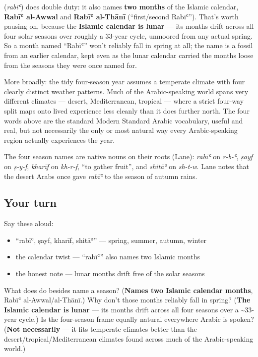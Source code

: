 \begin{culture}
\textbf{} (\emph{rabīʿ}) does double duty: it also names \textbf{two months} of the Islamic calendar, \textbf{Rabīʿ al-Awwal} and \textbf{Rabīʿ al-Thānī} (\textquotedblleft{}first/second Rabīʿ\textquotedblright{}). That's worth pausing on, because the \textbf{Islamic calendar is lunar} — its months drift across all four solar seasons over roughly a 33-year cycle, unmoored from any actual spring. So a month named \textquotedblleft{}Rabīʿ\textquotedblright{} won't reliably fall in spring at all; the name is a fossil from an earlier calendar, kept even as the lunar calendar carried the months loose from the seasons they were once named for.

More broadly: the tidy four-season year assumes a temperate climate with four clearly distinct weather patterns. Much of the Arabic-speaking world spans very different climates — desert, Mediterranean, tropical — where a strict four-way split maps onto lived experience less cleanly than it does further north. The four words above are the standard Modern Standard Arabic vocabulary, useful and real, but not necessarily the only or most natural way every Arabic-speaking region actually experiences the year.
\end{culture}

\begin{cousinweb}
The four season names are native nouns on their roots (Lane): \emph{rabīʿ} on \emph{r-b-ʿ}, \emph{ṣayf} on \emph{ṣ-y-f}, \emph{kharīf} on \emph{kh-r-f}, \textquotedblleft{}to gather fruit\textquotedblright{}, and \emph{shitāʾ} on \emph{sh-t-w}. Lane notes that the desert Arabs once gave \emph{rabīʿ} to the season of autumn rains.
\end{cousinweb}

\subsection*{Your turn}
Say these aloud:

\begin{itemize}
\raggedright
  \item \textquotedblleft{}rabīʿ, ṣayf, kharīf, shitāʾ\textquotedblright{} — spring, summer, autumn, winter
  \item the calendar twist — \textquotedblleft{}rabīʿ\textquotedblright{} also names two Islamic months
  \item the honest note — lunar months drift free of the solar seasons
\end{itemize}

\begin{tcolorbox}[breakable,colback=teal!4,colframe=teal!35!black,title={Before you move on}]
What does \textbf{} do besides name a season? (\textbf{Names two Islamic calendar months}, Rabīʿ al-Awwal/al-Thānī.) Why don't those months reliably fall in spring? (\textbf{The Islamic calendar is lunar} — its months drift across all four seasons over a \textasciitilde{}33-year cycle.) Is the four-season frame equally natural everywhere Arabic is spoken? (\textbf{Not necessarily} — it fits temperate climates better than the desert/tropical/Mediterranean climates found across much of the Arabic-speaking world.)
\end{tcolorbox}
